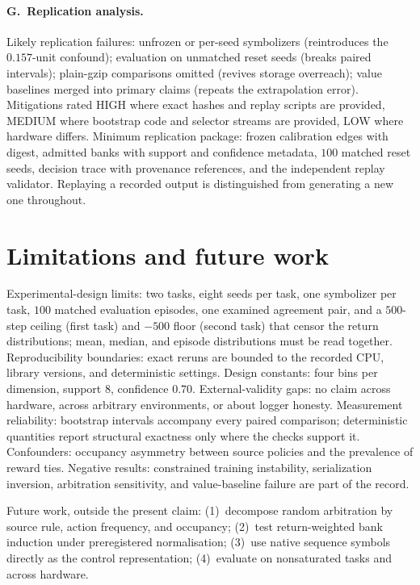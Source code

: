 \documentclass[11pt,a4paper]{article}
\theoremstyle{definition}
\begin{document}
\paragraph{G.~Replication analysis.}
Likely replication failures: unfrozen or per-seed symbolizers (reintroduces
the $0.157$-unit confound); evaluation on unmatched reset seeds (breaks
paired intervals); plain-gzip comparisons omitted (revives storage
overreach); value baselines merged into primary claims (repeats the
extrapolation error). Mitigations rated HIGH where exact hashes and replay
scripts are provided, MEDIUM where bootstrap code and selector streams are
provided, LOW where hardware differs. Minimum replication package: frozen
calibration edges with digest, admitted banks with support and confidence
metadata, $100$ matched reset seeds, decision trace with provenance
references, and the independent replay validator. Replaying a recorded output
is distinguished from generating a new one throughout.

\section{Limitations and future work}
\label{sec:limitations}

Experimental-design limits: two tasks, eight seeds per task, one symbolizer
per task, $100$ matched evaluation episodes, one examined agreement pair,
and a $500$-step ceiling (first task) and $-500$ floor (second task) that
censor the return distributions; mean, median, and episode distributions must
be read together. Reproducibility boundaries: exact reruns are bounded to the
recorded CPU, library versions, and deterministic settings. Design constants:
four bins per dimension, support $8$, confidence $0.70$. External-validity
gaps: no claim across hardware, across arbitrary environments, or about
logger honesty. Measurement reliability: bootstrap intervals accompany every
paired comparison; deterministic quantities report structural exactness only
where the checks support it. Confounders: occupancy asymmetry between source
policies and the prevalence of reward ties. Negative results: constrained
training instability, serialization inversion, arbitration sensitivity, and
value-baseline failure are part of the record.

Future work, outside the present claim: (1)~decompose random arbitration by
source rule, action frequency, and occupancy; (2)~test return-weighted bank
induction under preregistered normalisation; (3)~use native sequence symbols
directly as the control representation; (4)~evaluate on nonsaturated tasks
and across hardware.
\end{document}
